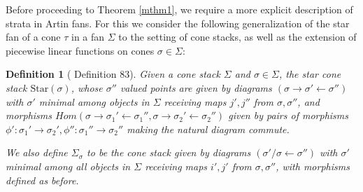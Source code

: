 \documentclass[12pt, oneside]{amsart}   	%
\newcounter{thm}
\newtheorem{definition}[thm]{Definition}
\numberwithin{equation}{section}
\numberwithin{thm}{section}
\numberwithin{figure}{section}
\begin{document}
Before proceeding to Theorem \ref{mthm1}, we require a more explicit description of strata in Artin fans. For this we consider the following generalization of the star fan of a cone $\tau$ in a fan $\Sigma$ to the setting of cone stacks, as well as the extension of piecewise linear functions on cones $\sigma \in \Sigma$:

\begin{definition}[\cite{logtaut} Definition $83$]
Given a cone stack $\Sigma$ and $\sigma \in \Sigma$, the \emph{star cone stack} $\text{Star}(\sigma)$, whose $\sigma''$ valued points are given by diagrams $(\sigma \rightarrow \sigma' \leftarrow \sigma'')$ with $\sigma'$ minimal among objects in $\Sigma$ receiving maps $j',j''$ from $\sigma,\sigma''$, and morphisms $Hom(\sigma \rightarrow \sigma_1' \leftarrow \sigma_1'',\sigma \rightarrow \sigma_2' \leftarrow \sigma_2'')$ given by pairs of morphisms $\phi': \sigma_1' \rightarrow \sigma_2',\phi'': \sigma_1'' \rightarrow \sigma_2''$ making the natural diagram commute. 

We also define $\Sigma_\sigma$ to be the cone stack given by diagrams $(\sigma'/\sigma \leftarrow \sigma'')$ with $\sigma'$ minimal among all objects in $\Sigma$ receiving maps $i',j'$ from $\sigma,\sigma''$, with morphisms defined as before.
\end{definition}



%
\end{document}
